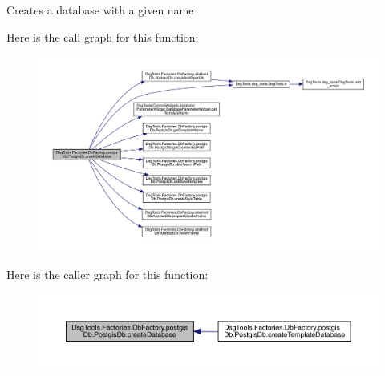 \begin{DoxyVerb}Creates a database with a given name
\end{DoxyVerb}
 Here is the call graph for this function\+:
\nopagebreak
\begin{figure}[H]
\begin{center}
\leavevmode
\includegraphics[width=350pt]{class_dsg_tools_1_1_factories_1_1_db_factory_1_1postgis_db_1_1_postgis_db_aecdf533d27f0820aa5caa706b1f89cf0_cgraph}
\end{center}
\end{figure}
Here is the caller graph for this function\+:
\nopagebreak
\begin{figure}[H]
\begin{center}
\leavevmode
\includegraphics[width=350pt]{class_dsg_tools_1_1_factories_1_1_db_factory_1_1postgis_db_1_1_postgis_db_aecdf533d27f0820aa5caa706b1f89cf0_icgraph}
\end{center}
\end{figure}
\mbox{\label{class_dsg_tools_1_1_factories_1_1_db_factory_1_1postgis_db_1_1_postgis_db_a83a30c916b02c4ad03dc5dccd7f7e25a}} 
